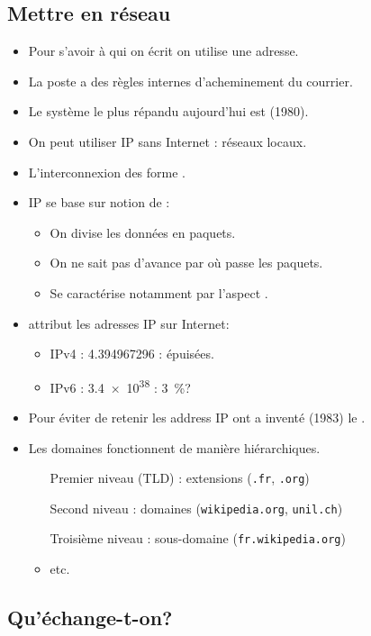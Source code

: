 \subsection{Mettre en réseau}
\begin{frame}
	\begin{itemize}
		\item Pour s'avoir à qui on écrit on utilise une adresse.
		\item La poste a des règles internes d'acheminement du courrier.
		\item Le système le plus répandu aujourd'hui est  (1980).
	\end{itemize}
\end{frame}

\begin{frame}
	\begin{itemize}
		\item On peut utiliser IP sans Internet : réseaux locaux.
		\item L'interconnexion des  forme .
		\item IP se base sur notion de :
			\begin{itemize}
				\item On divise les données en paquets.
				\item On ne sait pas d'avance par où passe les paquets.
				\item Se caractérise notamment par l'aspect .
			\end{itemize}
		\item {} attribut les adresses IP sur Internet:
			\begin{itemize}
				\item IPv4 : \num{4,3 94 967 296} : épuisées.
				\item IPv6 : \num{3,4e38} : \SI{3}{\percent}?
			\end{itemize}
	\end{itemize}

\end{frame}

\begin{frame}
	\begin{itemize}
		\item Pour éviter de retenir les address IP ont a inventé (1983) le .
		\item Les domaines fonctionnent de manière hiérarchiques.
		\begin{itemize}
			\item[Premier niveau (TLD)] : extensions (\verb+.fr+, \verb+.org+)
			\item[Second niveau] : domaines (\verb+wikipedia.org+, \verb+unil.ch+)
			\item[Troisième niveau] : sous-domaine (\verb+fr.wikipedia.org+)
			\item etc.
		\end{itemize}
	\end{itemize}
\end{frame}

\subsection{Qu'échange-t-on?}%